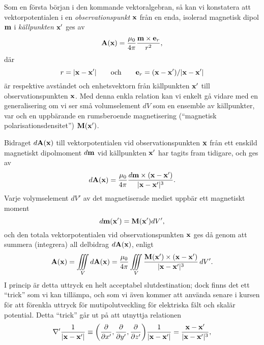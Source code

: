 Som en f{\"o}rsta b{\"o}rjan i den kommande vektoralgebran, s{\aa} kan vi
konstatera att vektorpotentialen i en {\it observationspunkt} ${\bf x}$
fr{\aa}n en enda, isolerad magnetisk dipol ${\bf m}$ i {\it k{\"a}llpunkten}
${\bf x}'$ ges av
$$
  {\bf A}({\bf x})={{\mu_0}\over{4\pi}}{{{\bf m}\times{\bf e}_r}\over{r^2}},
$$
d{\"a}r
$$
  r=|{\bf x}-{\bf x}'|
  \qquad\hbox{och}\qquad
  {\bf e}_r=({\bf x}-{\bf x}')/|{\bf x}-{\bf x}'|
$$
{\"a}r respektive avst{\aa}ndet och enhetsvektorn fr{\aa}n k{\"a}llpunkten
${\bf x}'$ till observationspunkten ${\bf x}$. Med denna enkla relation kan
vi enkelt g{\aa} vidare med en generalisering om vi ser sm{\aa} volumselement
$dV$ som en ensemble av k{\"a}llpunkter, var och en uppb{\"a}rande en
rumsberoende magnetisering (``magnetisk polarisationsdensitet'')
${\bf M}({\bf x}')$.
\medskip
\centerline{}
\medskip
\noindent
Bidraget $d{\bf A}({\bf x})$ till vektorpotentialen vid observationspunkten
${\bf x}$ fr{\aa}n ett enskild magnetiskt dipolmoment $d{\bf m}$ vid
k{\"a}llpunkten ${\bf x}'$ har tagits fram tidigare, och ges av
$$
  d{\bf A}({\bf x})={{\mu_0}\over{4\pi}}
     {{d{\bf m}\times({\bf x}-{\bf x}')}\over{|{\bf x}-{\bf x}'|^3}}.
$$
Varje volymselement $dV'$ av det magnetiserade mediet uppb{\"a}r ett magnetiskt
moment
$$
  d{\bf m}({\bf x}')={\bf M}({\bf x}')dV',
$$
och den totala vektorpotentialen vid observationspunkten ${\bf x}$ ges d{\aa}
genom att summera (integrera) all delbidrag $d{\bf A}({\bf x})$, enligt
$$
  {\bf A}({\bf x}) = \iiint_V d{\bf A}({\bf x})
  ={{\mu_0}\over{4\pi}}
     \iiint_V{{{\bf M}({\bf x}')\times({\bf x}-{\bf x}')}
                       \over{|{\bf x}-{\bf x}'|^3}}\,dV'.
$$
I princip {\"a}r detta uttryck en helt acceptabel slutdestination; dock finns
det ett ``trick'' som vi kan till{\"a}mpa, och som vi {\"a}ven kommer att
anv{\"a}nda senare i kursen f{\"o}r att f{\"o}renkla uttryck f{\"o}r
mutipolutveckling f{\"o}r elektriska f{\"a}lt och skal{\"a}r potential.
Detta ``trick'' g{\aa}r ut p{\aa} att utnyttja relationen
$$
  \nabla'{{1}\over{|{\bf x}-{\bf x}'|}}
  \equiv
     \bigg(
       {{\partial}\over{\partial x'}},
       {{\partial}\over{\partial y'}},
       {{\partial}\over{\partial z'}}
     \bigg)
     {{1}\over{|{\bf x}-{\bf x}'|}}
  ={{{\bf x}-{\bf x}'}\over{|{\bf x}-{\bf x}'|^3}},
$$
